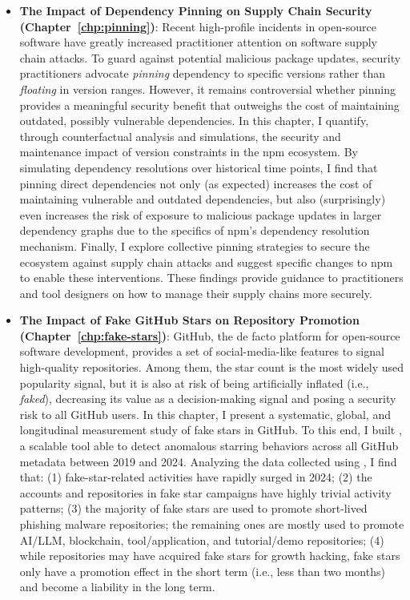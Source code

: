 \begin{itemize}[leftmargin=15pt]
    \item \textbf{The Impact of Dependency Pinning on Supply Chain Security (Chapter~\ref{chp:pinning})}: Recent high-profile incidents in open-source software have greatly increased practitioner attention on software supply chain attacks. 
    To guard against potential malicious package updates, security practitioners advocate \emph{pinning} dependency to specific versions rather than \emph{floating} in version ranges.
    However, it remains controversial whether pinning provides a meaningful security benefit that outweighs the cost of maintaining outdated, possibly vulnerable dependencies.
    In this chapter, I quantify, through counterfactual analysis and simulations, the security and maintenance impact of version constraints in the npm ecosystem. 
    By simulating dependency resolutions over historical time points, I find that pinning direct dependencies not only (as expected) increases the cost of maintaining vulnerable and outdated dependencies, but also (surprisingly) even increases the risk of exposure to malicious package updates in larger dependency graphs due to the specifics of npm's dependency resolution mechanism. 
    Finally, I explore collective pinning strategies to secure the ecosystem against supply chain attacks and suggest specific changes to npm to enable these interventions.
    These findings provide guidance to practitioners and tool designers on how to manage their supply chains more securely.
    \item  \textbf{The Impact of Fake GitHub Stars on Repository Promotion (Chapter~\ref{chp:fake-stars})}: GitHub, the de facto platform for open-source software development, provides a set of social-media-like features to signal high-quality repositories.
    Among them, the star count is the most widely used popularity signal, but it is also at risk of being artificially inflated (i.e., \emph{faked}), decreasing its value as a decision-making signal and posing a security risk to all GitHub users.
    In this chapter, I present a systematic, global, and longitudinal measurement study of fake stars in GitHub.
    To this end, I built \SystemName, a scalable tool able to detect anomalous starring behaviors across all GitHub metadata between 2019 and 2024.
    Analyzing the data collected using \SystemName, I find that: (1) fake-star-related activities have rapidly surged in 2024; (2) the accounts and repositories in fake star campaigns have highly trivial activity patterns; (3) the majority of fake stars are used to promote short-lived phishing malware repositories; the remaining ones are mostly used to promote AI/LLM, blockchain, tool/application, and tutorial/demo repositories; (4) while repositories may have acquired fake stars for growth hacking, fake stars only have a promotion effect in the short term (i.e., less than two months) and become a liability in the long term.

\end{itemize}
